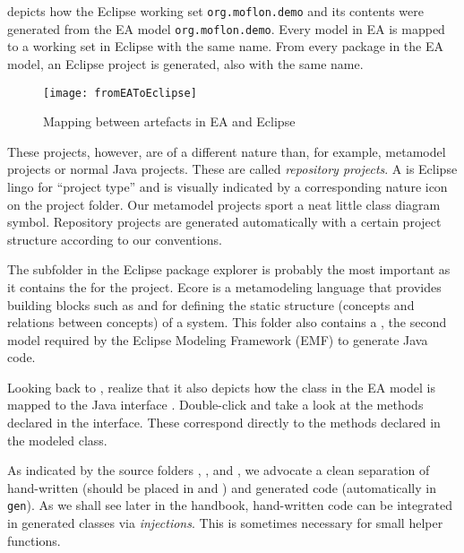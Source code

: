  depicts how the Eclipse working set \texttt{org.moflon.demo} and its contents were generated from the EA model \texttt{org.moflon.demo}. Every model
in EA is mapped to a working set in Eclipse with the same name. From every package in the EA model, an Eclipse project is generated, also with the same name.

\begin{figure}[htbp]
    \centering
  \texttt{[image: fromEAToEclipse]}
    \caption{Mapping between artefacts in EA and Eclipse}
    \label{fig:fromEAtoEclipse}
\end{figure}

These projects, however, are of a different nature than, for example, metamodel projects or normal Java projects.
These are called \emph{repository projects}.
A  is Eclipse lingo for \enquote{project type} and is visually indicated by a corresponding nature icon on the project folder.
Our metamodel projects sport a neat little class diagram symbol.
Repository projects are generated automatically with a certain project structure according to our conventions.

The  subfolder in the Eclipse package explorer is probably the most important as it contains the  for the project. Ecore is a metamodeling language that provides building blocks such as  and  for defining the static structure (concepts and relations between concepts) of a system.
This folder also contains a , the second model required by the Eclipse Modeling Framework (EMF) to generate Java code.

Looking back to , realize that it also depicts how the class  in the EA model is mapped to the Java interface .
Double-click  and take a look at the methods declared in the interface. These correspond directly to the methods declared in the modeled  class.

As indicated by the source folders , , and , we advocate a clean separation of hand-written (should be placed in  and ) and generated code (automatically in \texttt{gen}).
As we shall see later in the handbook, hand-written code can be
integrated in generated classes via \emph{injections}.
This is sometimes necessary for small helper functions.

